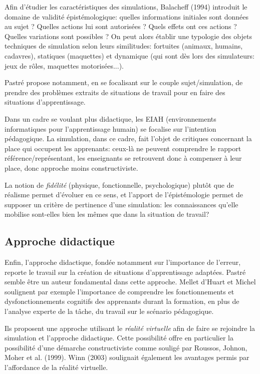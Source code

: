 \documentclass{article}
\begin{document}
Afin d'étudier les caractéristiques des simulations, Balacheff (1994) 
introduit le domaine de validité épistémologique: quelles informations 
initiales sont données au sujet ? Quelles actions lui sont autorisées ? 
Quels effets ont ces actions ? Quelles variations sont possibles ?
On peut alors établir une typologie des objets techniques de simulation 
selon leurs similitudes: fortuites (animaux, humains, cadavres), statiques 
(maquettes) et dynamique (qui sont dès lors des simulateurs: jeux de 
rôles, maquettes motorisées...).

Pastré propose notamment, en se focalisant sur le couple sujet/simulation, 
de prendre des problèmes extraits de situations de travail pour en faire 
des situations d'apprentissage.

Dans un cadre se voulant plus didactique, les EIAH (environnements 
informatiques pour l'apprentissage humain) se focalise sur l'intention 
pédagogique.
La simulation, dans ce cadre, fait l'objet de critiques concernant la 
place qui occupent les apprenants: ceux-là ne peuvent comprendre le 
rapport référence/représentant, les enseignants se retrouvent donc à 
compenser à leur place, donc approche moins constructiviste.

La notion de \emph{fidélité} (physique, fonctionnelle, psychologique) 
plutôt que de réalisme permet d'évoluer en ce sens, et l'apport de 
l'épistémologie permet de supposer un critère de pertinence d'une 
simulation: les connaissances qu'elle mobilise sont-elles bien les mêmes 
que dans la situation de travail?
\\

\subsection{Approche didactique}

Enfin, l'approche didactique, fondée notamment sur l'importance de 
l'erreur, reporte le travail sur la création de situations d'apprentissage 
adaptées. Pastré semble être un auteur fondamental dans cette approche.
Mellet d'Huart et Michel \cite{mellet-dhuart_faciliter_2005} soulignent 
par exemple l'importance de comprendre les fonctionnements et 
dysfonctionnements cognitifs des apprenants durant la formation, en plus 
de l'analyse experte de la tâche, du travail sur le scénario pédagogique.

Ils proposent une approche utilisant le \emph{réalité virtuelle} afin de 
faire se rejoindre la simulation et l'approche didactique. Cette 
possibilité offre en particulier la possibilité d'une démarche 
constructiviste comme souligé par Roussos, Johnon, Moher et al. (1999). 
Winn (2003) soulignait également les avantages permis par l'affordance 
de la réalité virtuelle.
\end{document}
